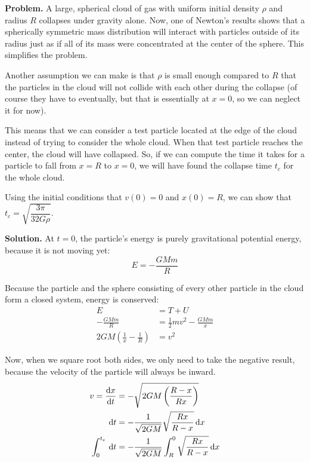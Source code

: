 \documentclass{article}
\begin{document}
\insertTitle

\textbf{Problem.} A large, spherical cloud of gas with uniform initial density $\rho$ and radius $R$ collapses under gravity alone. Now, one of Newton's results shows that a spherically symmetric mass distribution will interact with particles outside of its radius just as if all of its mass were concentrated at the center of the sphere. This simplifies the problem.

Another assumption we can make is that $\rho$ is small enough compared to $R$ that the particles in the cloud will not collide with each other during the collapse (of course they have to eventually, but that is essentially at $x = 0$, so we can neglect it for now).

This means that we can consider a test particle located at the edge of the cloud instead of trying to consider the whole cloud. When that test particle reaches the center, the cloud will have collapsed. So, if we can compute the time it takes for a particle to fall from $x = R$ to $x = 0$, we will have found the collapse time $t_c$ for the whole cloud.

Using the initial conditions that $v(0) = 0$ and $x(0) = R$, we can show that $t_c = \sqrt{\dfrac{3\pi}{32G\rho}}$.

\textbf{Solution.} At $t = 0$, the particle's energy is purely gravitational potential energy, because it is not moving yet:
\begin{equation*}
E = -\frac{GMm}{R}
\end{equation*}

Because the particle and the sphere consisting of every other particle in the cloud form a closed system, energy is conserved:
\begin{equation*}
\begin{aligned}
    E &= T + U \\
    -\frac{GMm}{R} &= \frac{1}{2} m{v}^2 - \frac{GMm}{x} \\
    2GM\left(\frac{1}{x} - \frac{1}{R}\right) &= {v}^2
\end{aligned}
\end{equation*}

Now, when we square root both sides, we only need to take the negative result, because the velocity of the particle will always be inward.
\begin{equation*}
\begin{aligned}
    v = \dv{x}{t} &= -\sqrt{2GM\left(\frac{R-x}{Rx}\right)} \\
    \dd{t} &= -\frac{1}{\sqrt{2GM}} \sqrt{\frac{Rx}{R-x}} \dd{x} \\
    \int_0^{t_c} \, \dd{t} &= -\frac{1}{\sqrt{2GM}} \int_R^0 \sqrt{\frac{Rx}{R-x}} \dd{x}
\end{aligned}
\end{equation*}
\end{document}
